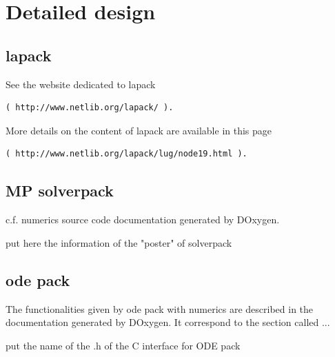 \section{Detailed design}
\subsection{\acs{lapack}}
See the website dedicated to \ac{lapack} 
\begin{verbatim}( http://www.netlib.org/lapack/ ).\end{verbatim}
More details on the content of \ac{lapack} are available in this page 
\begin{verbatim}( http://www.netlib.org/lapack/lug/node19.html ).\end{verbatim}


\subsection{MP solverpack}
c.f. \ac{numerics} source code documentation generated by DOxygen.
\begin{ndr}
put here the information of the "poster" of solverpack
\end{ndr}


\subsection{\ac{ode} pack}
The functionalities given by \ac{ode} pack with \ac{numerics} are described in the documentation generated by DOxygen.
It correspond to the section called ...
\begin{ndr}
put the name of the .h of the C interface for ODE pack
\end{ndr}
